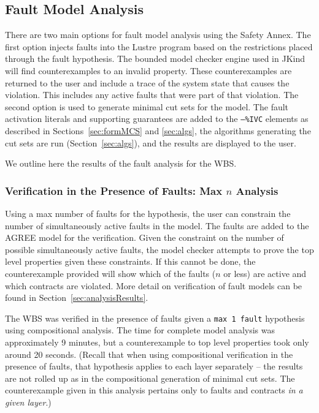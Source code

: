 \subsection{Fault Model Analysis}
There are two main options for fault model analysis using the Safety Annex. The first option injects faults into the Lustre program based on the restrictions placed through the fault hypothesis. The bounded model checker engine used in JKind will find counterexamples to an invalid property. These counterexamples are returned to the user and include a trace of the system state that causes the violation. This includes any active faults that were part of that violation. The second option is used to generate minimal cut sets for the model. The fault activation literals and supporting guarantees are added to the \texttt{--\%IVC} elements as described in Sections~\ref{sec:formMCS} and \ref{sec:algs}, the algorithms generating the cut sets are run (Section~\ref{sec:algs}), and the results are displayed to the user. 

We outline here the results of the fault analysis for the WBS. 

\subsubsection{Verification in the Presence of Faults: Max $n$ Analysis}
Using a max number of faults for the hypothesis, the user can constrain the number of simultaneously active faults in the model. The faults are added to the AGREE model for the verification. Given the constraint on the number of possible simultaneously active faults, the model checker attempts to prove the top level properties given these constraints. If this cannot be done, the counterexample provided will show which of the faults ($n$ or less) are active and which contracts are violated. More detail on verification of fault models can be found in Section~\ref{sec:analysisResults}. 

The WBS was verified in the presence of faults given a \texttt{max 1 fault} hypothesis using compositional analysis. The time for complete model analysis was approximately 9 minutes, but a counterexample to top level properties took only around 20 seconds. (Recall that when using compositional verification in the presence of faults, that hypothesis applies to each layer separately -- the results are not rolled up as in the compositional generation of minimal cut sets. The counterexample given in this analysis pertains only to faults and contracts \textit{in a given layer}.) 


